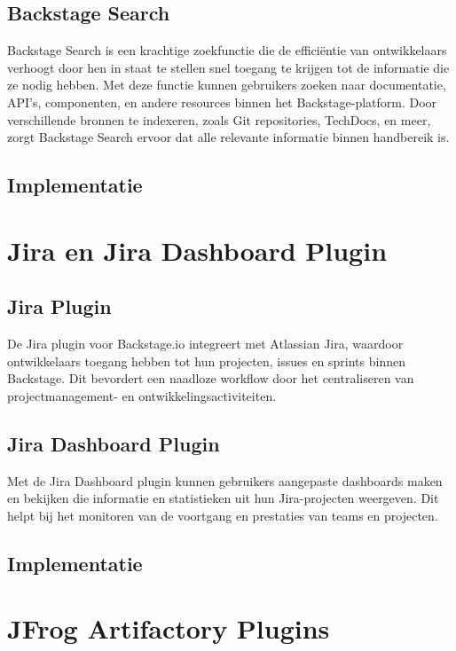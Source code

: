 \subsection{Backstage Search}

Backstage Search is een krachtige zoekfunctie die de efficiëntie van ontwikkelaars verhoogt door hen in staat te stellen snel toegang te krijgen tot de informatie die ze nodig hebben. Met deze functie kunnen gebruikers zoeken naar documentatie, API's, componenten, en andere resources binnen het Backstage-platform. Door verschillende bronnen te indexeren, zoals Git repositories, TechDocs, en meer, zorgt Backstage Search ervoor dat alle relevante informatie binnen handbereik is.

\subsection{Implementatie}

\section{Jira en Jira Dashboard Plugin}

\subsection{Jira Plugin}

De Jira plugin voor Backstage.io integreert met Atlassian Jira, waardoor ontwikkelaars toegang hebben tot hun projecten, issues en sprints binnen Backstage. Dit bevordert een naadloze workflow door het centraliseren van projectmanagement- en ontwikkelingsactiviteiten.

\subsection{Jira Dashboard Plugin}

Met de Jira Dashboard plugin kunnen gebruikers aangepaste dashboards maken en bekijken die informatie en statistieken uit hun Jira-projecten weergeven. Dit helpt bij het monitoren van de voortgang en prestaties van teams en projecten.

\subsection{Implementatie}

\section{JFrog Artifactory Plugins}

